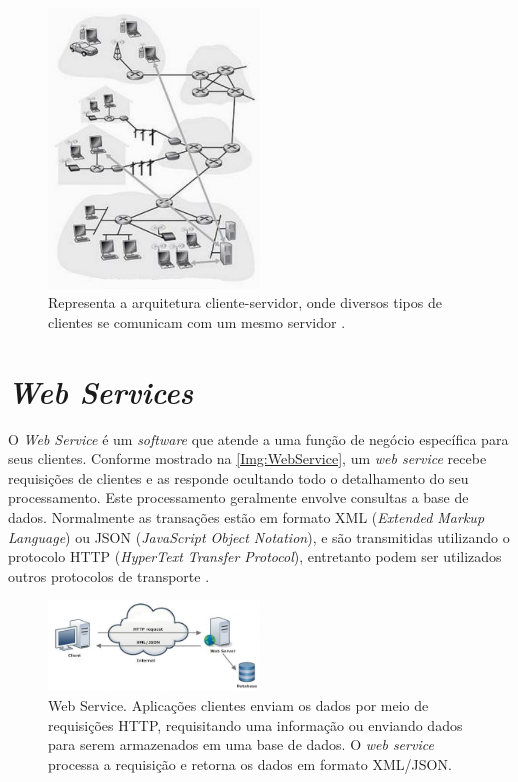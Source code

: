 \begin{figure}
	\centering
	\includegraphics[width=0.5\textwidth]{figuras/KuroseClienteServidorpg88.jpg}
	\caption[Arquitetura Cliente-Servidor.]{Representa a arquitetura cliente-servidor, onde diversos tipos de clientes se comunicam com um mesmo servidor \cite{Kurose:2010}.}
	\label{Img:ArquiteturaClienteServidor}
\end{figure}


\section{\textit{Web Services}}\label{sec:WebServices}

O \textit{Web Service} é um \textit{software} que atende a uma função de negócio específica para seus clientes. Conforme mostrado na \autoref{Img:WebService}, um \textit{web service} recebe requisições de clientes e as responde ocultando todo o detalhamento do seu processamento. Este processamento geralmente envolve consultas a base de dados. Normalmente as transações estão em formato XML (\textit{Extended Markup Language}) ou JSON (\textit{JavaScript Object Notation}), e são transmitidas utilizando o protocolo HTTP (\textit{HyperText Transfer Protocol}), entretanto podem ser utilizados outros protocolos de transporte \cite{Sampaio:2003}.

\begin{figure}[H]
	\centering
	\includegraphics[width=0.5\textwidth]{figuras/webService.jpg}
	\caption[Web Service]{Web Service. Aplicações clientes enviam os dados por meio de requisições HTTP, requisitando uma informação ou enviando dados para serem armazenados em uma base de dados. O \textit{web service} processa a requisição e retorna os dados em formato XML/JSON.}
	\label{Img:WebService}
\end{figure}

